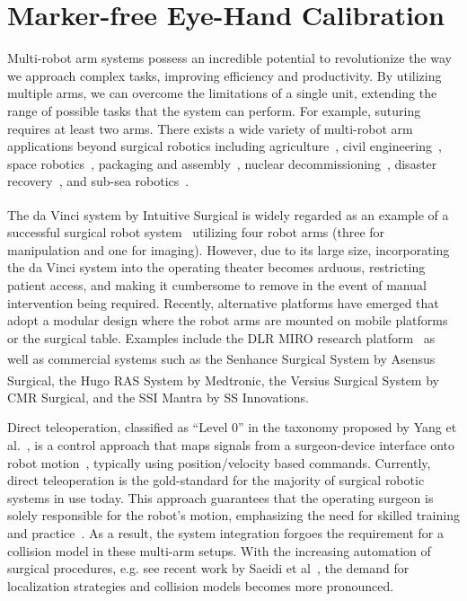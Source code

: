 \graphicspath{{chapter_1}}
\chapter[Marker-free Eye-Hand Calibration]{Marker-free Eye-Hand Calibration}
\label{chap:registration}
\minitoc
Multi-robot arm systems possess an incredible potential to revolutionize the way we approach complex tasks, improving efficiency and productivity. 
By utilizing multiple arms, we can overcome the limitations of a single unit, extending the range of possible tasks that the system can perform. 
For example, suturing requires at least two arms.
There exists a wide variety of multi-robot arm applications beyond surgical robotics including 
agriculture~\cite{Xiong20}, 
civil engineering~\cite{Yasutomi23}, 
space robotics~\cite{Yan20},
packaging and assembly~\cite{Do12},
nuclear decommissioning~\cite{Mohamed07},
disaster recovery~\cite{Kamezaki16}, and
sub-sea robotics~\cite{Brantner21}.

The da Vinci\textsuperscript{\textregistered} system by Intuitive Surgical is widely regarded as an example of a successful surgical robot system~\cite{yang2018grand, DEttorre2021} utilizing four robot arms (three for manipulation and one for imaging).
However, due to its large size, incorporating the da Vinci system into the operating theater becomes arduous, restricting patient access, and making it cumbersome to remove in the event of manual intervention being required.
Recently, alternative platforms have emerged that adopt a modular design where the robot arms are mounted on mobile platforms or the surgical table. 
Examples include the 
DLR MIRO research platform~\citep{miro}
as well as commercial systems such as 
the Senhance\textsuperscript{\texttrademark} Surgical System by Asensus Surgical, 
the Hugo\textsuperscript{\texttrademark} RAS System by Medtronic, 
the Versius\textsuperscript{\textregistered} Surgical System by CMR Surgical, and 
the SSI Mantra by SS Innovations.

Direct teleoperation, classified as ``Level 0'' in the taxonomy proposed by Yang et al.~\cite{Yang2017}, is a control approach that maps signals from a surgeon-device interface onto robot motion~\cite{Niemeyer2008}, typically using position/velocity based commands.
Currently, direct teleoperation is the gold-standard for the majority of surgical robotic systems in use today.
This approach guarantees that the operating surgeon is solely responsible for the robot's motion, emphasizing the need for skilled training and practice~\cite{Liu15}. 
As a result, the system integration forgoes the requirement for a collision model in these multi-arm setups.
With the increasing automation of surgical procedures, e.g. see recent work by Saeidi et al~\cite{Saeidi2022}, the demand for localization strategies and collision models becomes more pronounced.

